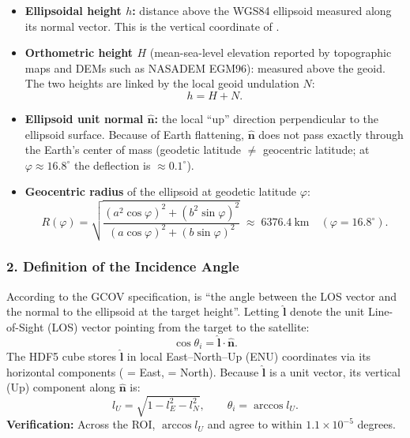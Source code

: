 \documentclass[11pt,a4paper]{article}
\begin{document}
\begin{itemize}
  \item \textbf{Ellipsoidal height $h$:} distance above the WGS84 ellipsoid measured along its normal vector. This is the vertical coordinate of .
  \item \textbf{Orthometric height $H$} (mean-sea-level elevation reported by topographic maps and DEMs such as NASADEM EGM96): measured above the geoid. The two heights are linked by the local geoid undulation $N$:
        \begin{equation}
          h = H + N .
        \end{equation}
  \item \textbf{Ellipsoid unit normal $\hat{\mathbf{n}}$:} the local ``up'' direction perpendicular to the ellipsoid surface. Because of Earth flattening, $\hat{\mathbf{n}}$ does not pass exactly through the Earth's center of mass (geodetic latitude $\neq$ geocentric latitude; at $\varphi \approx 16.8^\circ$ the deflection is $\approx 0.1^\circ$).
  \item \textbf{Geocentric radius} of the ellipsoid at geodetic latitude $\varphi$:
        \begin{equation}
          R(\varphi) = \sqrt{\frac{(a^2\cos\varphi)^2 + (b^2\sin\varphi)^2}{(a\cos\varphi)^2 + (b\sin\varphi)^2}}
          \;\approx\; 6376.4\ \text{km} \quad (\varphi = 16.8^\circ).
        \end{equation}
\end{itemize}

\subsubsection*{2. Definition of the Incidence Angle}

According to the GCOV specification,  is ``the angle between the LOS vector and the normal to the ellipsoid at the target height''. Letting $\hat{\mathbf{l}}$ denote the unit Line-of-Sight (LOS) vector pointing from the target to the satellite:
\begin{equation}
  \cos\theta_i = \hat{\mathbf{l}}\cdot\hat{\mathbf{n}}.
  \label{eq:incidencia}
\end{equation}
The HDF5 cube stores $\hat{\mathbf{l}}$ in local East--North--Up (ENU) coordinates via its horizontal components ( = East,  = North). Because $\hat{\mathbf{l}}$ is a unit vector, its vertical (Up) component along $\hat{\mathbf{n}}$ is:
\begin{equation}
  l_U = \sqrt{1 - l_E^2 - l_N^2}, \qquad \theta_i = \arccos l_U .
\end{equation}
\textbf{Verification:} Across the ROI, $\arccos l_U$ and  agree to within $1.1\times10^{-5}$ degrees.
\end{document}
